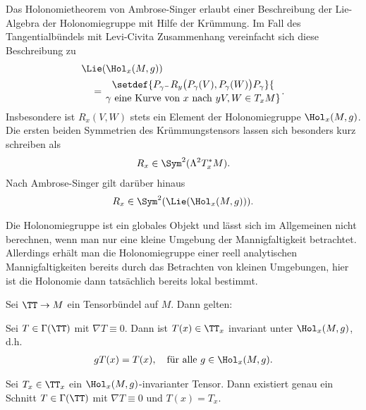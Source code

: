 \documentclass[%
	paper=a5,%
	fleqn,%
	DIV=18,%
	BCOR=0mm,
	fontsize=11pt,
	titlepage=false,%
	bibliography=totoc,
	DIV=18,%
	twoside=true,
	pdftitle=Riemannsche Geometrie,
	pdfauthor=Uwe Semmelmann,
	numbers=noendperiod]%
	{scrbook}
\begin{document}
\begin{rem}[Bemerkungen.]
\begin{remenum}
\item
Das Holonomietheorem von Ambrose-Singer erlaubt einer Beschreibung der Lie-Algebra der Holonomiegruppe mit Hilfe der Krümmung. Im Fall des Tangentialbündels mit Levi-Civita Zusammenhang vereinfacht sich diese Beschreibung zu
\begin{align*}
&\Lie(\Hol_{x}(M,g)) \\
&\quad= \setdef{P_{\gamma^-} R_{y}\bigl(P_{\gamma}(V),P_{\gamma}(W)\bigr) P_{\gamma}}{\atop{\gamma \text{ eine Kurve von }x\text{ nach }y}{ V,W\in T_{x}M}}.
\end{align*}
Insbesondere ist $R_{x}(V,W)$ stets ein Element der Holonomiegruppe $\Hol_{x}(M,g)$. Die ersten beiden Symmetrien des Krümmungstensors lassen sich besonders kurz schreiben als
\begin{align*}
R_{x}\in \Sym^2(\Lambda^2 T_{x}^*M).
\end{align*}
Nach Ambrose-Singer gilt darüber hinaus
\begin{align*}
R_{x}\in \Sym^2(\Lie(\Hol_{x}(M,g))).
\end{align*}
\item Die Holonomiegruppe ist ein globales Objekt und lässt sich im Allgemeinen nicht berechnen, wenn man nur eine kleine Umgebung der Mannigfaltigkeit betrachtet. Allerdings erhält man die Holonomiegruppe einer reell analytischen Mannigfaltigkeiten bereits durch das Betrachten von kleinen Umgebungen, hier ist die Holonomie dann tatsächlich bereits lokal bestimmt.\map
\end{remenum}
\end{rem}


\begin{prop}
Sei $\TT\to M$ ein Tensorbündel auf $M$. Dann gelten:
\begin{propenum}
\item Sei $T\in \Gamma(\TT)$ mit $\nabla T \equiv 0$. Dann ist $T(x) \in\TT_{x}$ invariant unter $\Hol_{x}(M,g)$, d.h.
\begin{align*}
g T(x) = T(x),\quad \text{für alle }g\in \Hol_{x}(M,g).
\end{align*}
\item Sei $T_{x}\in\TT_{x}$ ein $\Hol_{x}(M,g)$-invarianter Tensor. Dann existiert genau ein Schnitt $T\in \Gamma(\TT)$ mit $\nabla T \equiv 0$ und $T(x) = T_x$.\fish
\end{propenum}
\end{prop}
\end{document}
